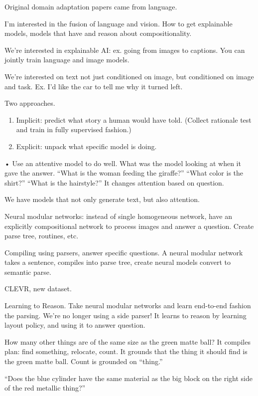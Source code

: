 Original domain adaptation papers came from language.

I'm interested in the fusion of language and vision. How to get explainable models, models that have and reason about compositionality.

We're interested in explainable AI: ex. going from images to captions. %
You can jointly train language and image models.

We're interested on text  not just conditioned on image, but conditioned on image and task. Ex. I'd like the car to tell me why it turned left.

Two approaches.
\begin{enumerate}
\item
Implicit: predict what story a human would have told. (Collect rationale test and train in fully supervised fashion.)
\item
Explicit: unpack what specific model is doing.
\end{enumerate}•
Use an attentive model to do well.
What was the model looking at when it gave the answer. ``What is the woman feeding the giraffe?'' ``What color is the shirt?'' ``What is the hairstyle?'' It changes attention based on question.

We have models that not only generate text, but also attention. %

Neural modular networks: instead of single homogeneous network, have an explicitly compositional network to process images and answer a question. Create parse tree, routines, etc.

Compiling using parsers, answer specific questions. A neural modular network takes a sentence, compiles into parse tree, create neural models convert to semantic parse. 

CLEVR, new dataset. 

Learning to Reason. Take neural modular networks and learn end-to-end fashion the parsing. We're no longer using a side parser! It learns to reason by learning layout policy, and using it to answer question. 

How many other things are of the same size as the green matte ball? It compiles plan: find something, relocate, count. It grounds that the thing it should find is the green matte ball. Count is grounded on ``thing.'' %

``Does the blue cylinder have the same material as the big block on the right side of the red metallic thing?''

